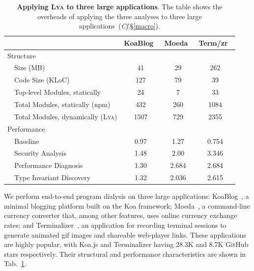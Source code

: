 \documentclass[letterpaper,twocolumn,10pt]{article}
\newcommand{\cf}[1]{(\emph{Cf}.\S\ref{#1})}
\newcommand{\sys}{{\scshape Lya}\xspace}
\begin{document}
\begin{table}[b]
\center
\footnotesize
\setlength\tabcolsep{3pt}
\caption{
  \footnotesize{
    \textbf{Applying \sys to three large applications}.
    The table shows the overheads of applying the three analyses to three large applications~\cf{macro}.
  }
}
\begin{tabular*}{\columnwidth}{l @{\extracolsep{\fill}} ccc}
\toprule
                                     & KoaBlog~\cite{koa}    & Moeda~\cite{moeda}   &  Term/zr~\cite{terminalizer} \\
\midrule
Structure                            &                   &                      &              \\
~~Size (MB)                          & 41                &  29                  &   262        \\
~~Code Size (KLoC)                   & 127               &  79                  &   39         \\
~~Top-level Modules, statically      &  24               &  7                   &    33         \\
~~Total Modules, statically (npm)    &  432              &  260                 &    1084       \\
~~Total Modules, dynamically (\sys)  &  1507             &   729                &     2355      \\
Performance                          &                   &                      &              \\
~~Baseline                           &  0.97             &  1.27                &    0.754      \\
~~Security Analysis                  &  1.48             &  2.00                &    3.346      \\
~~Performance Diagnosis              &  1.30             &  2.684               &    2.684      \\
~~Type Invariant Discovery           &  1.32             &  2.036               &    2.615      \\     
\bottomrule
\end{tabular*}
\label{tab:macro}
\vspace{-5mm}
\end{table}


We perform end-to-end program dialysis on three large applications:
  KoaBlog~\cite{koa}, a minimal blogging platform built on the Koa framework;
  Moeda~\cite{moeda}, a command-line currency converter that, among other features, uses online currency exchange rates; and
  Terminalizer~\cite{terminalizer}, an application for recording terminal sessions to generate animated gif images and shareable web-player links.
These applications are highly popular, with Koa.js and Terminalizer having 28.3K and 8.7K GitHub stars respectively.
Their structural and performance characteristics are shown in Tab.~\ref{tab:macro}.
\end{document}
